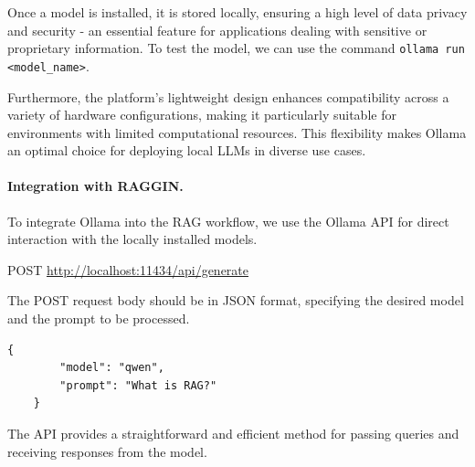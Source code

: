 Once a model is installed, it is stored locally, ensuring a high level of data privacy and security - an essential feature for applications dealing with sensitive or proprietary information. To test the model, we can use the command \verb|ollama run <model_name>|.

Furthermore, the platform's lightweight design enhances compatibility across a variety of hardware configurations, making it particularly suitable for environments with limited computational resources. This flexibility makes Ollama an optimal choice for deploying local LLMs in diverse use cases.









\paragraph*{Integration with RAGGIN.} To integrate Ollama into the RAG workflow, we use the Ollama API for direct interaction with the locally installed models.

POST \url{http://localhost:11434/api/generate}

The POST request body should be in JSON format, specifying the desired model and the prompt to be processed.

\begin{lstlisting}[caption=Ollama JSON payload example]
	{
		"model": "qwen",
		"prompt": "What is RAG?"
	}
\end{lstlisting}

The API provides a straightforward and efficient method for passing queries and receiving responses from the model. 



